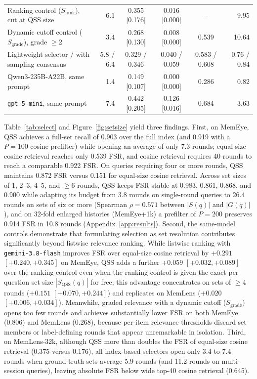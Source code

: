 \documentclass[10pt]{article}
\newcommand{\qss}{QSS}
\begin{document}
\begin{table}[t]
{\begin{tabular}{lrcccr}
\quad Ranking control ($S_{\mathrm{rank}}$), cut at \qss{} size & 6.1 & 0.355 [0.176] & 0.016 [0.000] & -- & 9.95 \\
\quad Dynamic cutoff control ($S_{\mathrm{grade}}$), grade $\ge$2 & 3.4 & 0.268 [0.130] & 0.008 [0.000] & 0.539 & 10.64 \\
Lightweight selector / with sampling consensus & 5.8 / 6.4 & 0.329 / 0.346 & 0.040 / 0.059 & 0.583 / 0.608 & 0.76 / 0.84 \\
Qwen3-235B-A22B, same prompt & 1.4 & 0.149 [0.107] & 0.000 [0.000] & 0.286 & 0.82 \\
\texttt{gpt-5-mini}, same prompt & 7.4 & 0.442 [0.205] & 0.126 [0.016] & 0.684 & 3.63 \\
\bottomrule
\end{tabular}}
\end{table}

Table~\ref{tab:select} and Figure~\ref{fig:setsize} yield three findings. First, on MemEye, \qss{} achieves a full-set recall of 0.903 over the full index (and 0.919 with a $P{=}100$ cosine prefilter) while opening an average of only 7.3 rounds; equal-size cosine retrieval reaches only 0.539 FSR, and cosine retrieval requires 40 rounds to reach a comparable 0.922 FSR. On queries requiring four or more rounds, \qss{} maintains 0.872 FSR versus 0.151 for equal-size cosine retrieval. Across set sizes of 1, 2--3, 4--5, and $\ge 6$ rounds, \qss{} keeps FSR stable at 0.983, 0.861, 0.868, and 0.900 while adapting its budget from 3.8 rounds on single-round queries to 26.4 rounds on sets of six or more (Spearman $\rho{=}0.571$ between $|S(q)|$ and $|G(q)|$), and on 32-fold enlarged histories (MemEye+1k) a prefilter of $P{=}200$ preserves 0.914 FSR in 10.8 rounds (Appendix~\ref{app:results}). Second, the same-model controls demonstrate that formulating selection as set resolution contributes significantly beyond listwise relevance ranking. While listwise ranking with \texttt{gemini-3.8-flash} improves FSR over equal-size cosine retrieval by $+0.291$ $[+0.240, +0.345]$ on MemEye, \qss{} adds a further $+0.059$ $[+0.032, +0.089]$ over the ranking control even when the ranking control is given the exact per-question set size $|S_{\mathrm{QSS}}(q)|$ for free; this advantage concentrates on sets of $\ge 4$ rounds ($+0.151$ $[+0.070, +0.244]$) and replicates on MemLens ($+0.020$ $[+0.006, +0.034]$). Meanwhile, graded relevance with a dynamic cutoff ($S_{\mathrm{grade}}$) opens too few rounds and achieves substantially lower FSR on both MemEye (0.806) and MemLens (0.268), because per-item relevance thresholds discard set members or label-defining rounds that appear unremarkable in isolation. Third, on MemLens-32k, although \qss{} more than doubles the FSR of equal-size cosine retrieval (0.375 versus 0.176), all index-based selectors open only 3.4 to 7.4 rounds when ground-truth sets average 5.9 rounds (and 11.2 rounds on multi-session queries), leaving absolute FSR below wide top-40 cosine retrieval (0.645).
\end{document}
